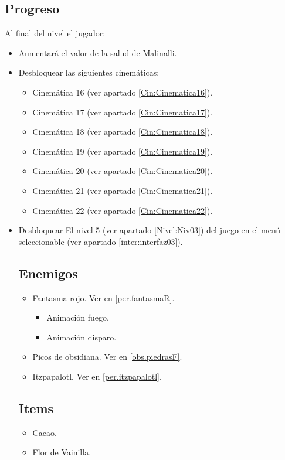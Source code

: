         \subsection{Progreso}
Al final del nivel el jugador:
\begin{itemize}
        \item Aumentará el valor de la salud de Malinalli.
        \item Desbloquear las siguientes cinemáticas:
		\begin{itemize}
			\item Cinemática 16 (ver apartado \ref{Cin:Cinematica16}).
			\item Cinemática 17 (ver apartado \ref{Cin:Cinematica17}).
			\item Cinemática 18 (ver apartado \ref{Cin:Cinematica18}).
			\item Cinemática 19 (ver apartado \ref{Cin:Cinematica19}).
			\item Cinemática 20 (ver apartado \ref{Cin:Cinematica20}).
			\item Cinemática 21 (ver apartado \ref{Cin:Cinematica21}).
			\item Cinemática 22 (ver apartado \ref{Cin:Cinematica22}).
		\end{itemize}
        \item Desbloquear El nivel 5 (ver apartado \ref{Nivel:Niv03}) del juego en el menú seleccionable (ver apartado \ref{inter:interfaz03}).
        \subsection{Enemigos}
                \begin{itemize}
                        \item Fantasma rojo. Ver en \ref{per.fantasmaR}. 
            \begin{itemize}
				\item Animación fuego.
				\item Animación disparo.
			\end{itemize}
                        \item Picos de obsidiana. Ver en \ref{obs.piedrasF}.
                        \item Itzpapalotl. Ver en \ref{per.itzpapalotl}.
                \end{itemize}
        \subsection{Items}
                \begin{itemize}
                        \item   Cacao.
                        \item Flor de Vainilla.
                \end{itemize}

\end{itemize}
